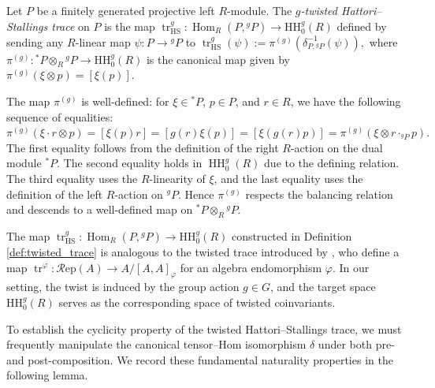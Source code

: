 \documentclass[11pt,oneside]{amsart}
\DeclareMathOperator{\HH}{HH}
\numberwithin{equation}{section}
\numberwithin{figure}{section}
\theoremstyle{plain}
\theoremstyle{definition}
\theoremstyle{remark}
\begin{document}
\begin{definition}\label{def:twisted_trace}
Let \(P\) be a finitely generated projective left \(R\)-module. The \emph{\(g\)-twisted Hattori--Stallings trace} on \(P\) is the map
\(
\operatorname{tr}_{\mathrm{HS}}^g \colon \operatorname{Hom}_R(P, {}^gP) \to \mathrm{HH}_0^g(R)
\)
defined by sending any \(R\)-linear map \(\psi \colon P \to {}^gP\) to
\(
\operatorname{tr}_{\mathrm{HS}}^g(\psi) := \pi^{(g)}(\delta_{P, {}^gP}^{-1}(\psi)),
\)
where \(\pi^{(g)} \colon {}^\ast P \otimes_R {}^gP \to \mathrm{HH}_0^g(R)\) is the canonical map given by \(\pi^{(g)}(\xi \otimes p) = [\xi(p)]\).
\end{definition}


 

\begin{remark}
The map $\pi^{(g)}$ is well-defined: for $\xi \in {}^*P$, $p \in P$, and $r \in R$, we have the following sequence of equalities:
\(
\pi^{(g)}(\xi\cdot r\otimes p)
=
[\xi(p)r]
=
[g(r)\xi(p)]
=
[\xi(g(r)p)]
=
\pi^{(g)}(\xi\otimes r\cdot_{{}^gP}p).
\)
The first equality follows from the definition of the right $R$-action on the dual module ${}^*P$. The second equality holds in $\HH_0^g(R)$ due to the defining relation. The third equality uses the \(R\)-linearity of \(\xi\), and
the last equality uses the definition of the left \(R\)-action on
\({}^gP\). Hence \(\pi^{(g)}\) respects the balancing relation and descends
to a well-defined map on \({}^*P\otimes_R{}^gP\).
\end{remark}

 \begin{remark}
The map \(\operatorname{tr}_{\mathrm{HS}}^g \colon \operatorname{Hom}_R(P, {}^gP) \to \mathrm{HH}_0^g(R)\) constructed in Definition \ref{def:twisted_trace} is analogous to the twisted trace introduced by \cite[Section 2.4.6]{BPW}, who define a map $\operatorname{tr}^\varphi \colon \mathcal{R}\text{ep}(A) \to A/[A,A]_\varphi$ for an algebra endomorphism $\varphi$. In our setting, the twist is induced by the group action $g \in G$, and the target space \(\mathrm{HH}_0^g(R)\) serves as the corresponding space of twisted coinvariants.
\end{remark}  


To establish the cyclicity property of the twisted Hattori--Stallings trace, we must frequently manipulate the canonical tensor--Hom isomorphism $\delta$ under both pre- and post-composition. We record these fundamental naturality properties in the following lemma.
\end{document}
